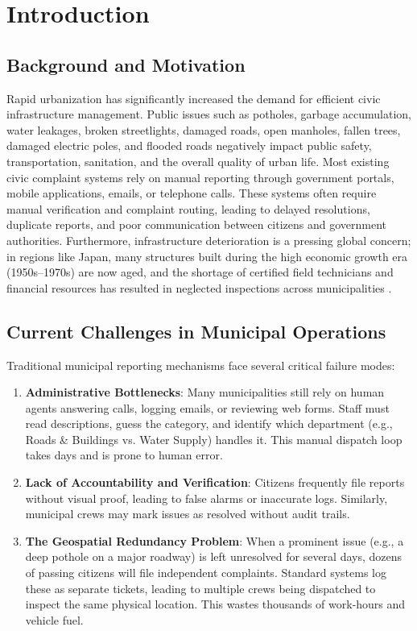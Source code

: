 \documentclass[journal]{IEEEtran}
\begin{document}
\section{Introduction}

\subsection{Background and Motivation}
Rapid urbanization has significantly increased the demand for efficient civic infrastructure management. Public issues such as potholes, garbage accumulation, water leakages, broken streetlights, damaged roads, open manholes, fallen trees, damaged electric poles, and flooded roads negatively impact public safety, transportation, sanitation, and the overall quality of urban life. Most existing civic complaint systems rely on manual reporting through government portals, mobile applications, emails, or telephone calls. These systems often require manual verification and complaint routing, leading to delayed resolutions, duplicate reports, and poor communication between citizens and government authorities. Furthermore, infrastructure deterioration is a pressing global concern; in regions like Japan, many structures built during the high economic growth era (1950s--1970s) are now aged, and the shortage of certified field technicians and financial resources has resulted in neglected inspections across municipalities \cite{b16}.

\subsection{Current Challenges in Municipal Operations}
Traditional municipal reporting mechanisms face several critical failure modes:
\begin{enumerate}
    \item \textbf{Administrative Bottlenecks}: Many municipalities still rely on human agents answering calls, logging emails, or reviewing web forms. Staff must read descriptions, guess the category, and identify which department (e.g., Roads \& Buildings vs. Water Supply) handles it. This manual dispatch loop takes days and is prone to human error.
    \item \textbf{Lack of Accountability and Verification}: Citizens frequently file reports without visual proof, leading to false alarms or inaccurate logs. Similarly, municipal crews may mark issues as resolved without audit trails.
    \item \textbf{The Geospatial Redundancy Problem}: When a prominent issue (e.g., a deep pothole on a major roadway) is left unresolved for several days, dozens of passing citizens will file independent complaints. Standard systems log these as separate tickets, leading to multiple crews being dispatched to inspect the same physical location. This wastes thousands of work-hours and vehicle fuel.
\end{enumerate}
\end{document}
